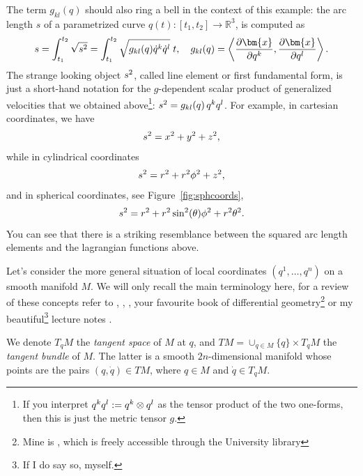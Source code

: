 \documentclass[english,fontsize=11pt,paper=a5,oneside]{scrbook}
\newcommand{\R}{\mathbb{R}}
\newcommand{\bx}{\bm{x}}
\newcommand{\lag}{\langle}
\newcommand{\rag}{\rangle}
\let\d\relax
\newcommand{\d}{\mathrm{d}}
\theoremstyle{definition}
\begin{document}
The term $g_{kl} (q)$ should also ring a bell in the context of this example: the arc length $s$ of a parametrized curve $q(t) : [t_1,t_2] \to \R^3$, is computed as
\begin{equation}\label{eq:arclen}
  \begin{aligned}
    s = \int_{t_1}^{t_2} \sqrt{\d s^2} = \int_{t_1}^{t_2} \sqrt{g_{kl}(q)\dot q^k \dot q^l} \;\d t,\quad
    g_{kl} (q) = \left\lag\frac{\partial\bx}{\partial q^k}, \frac{\partial \bx}{\partial q^l}\right\rag.
  \end{aligned}
\end{equation}
The strange looking object $\d s^2$, called line element or first fundamental form, is just a short-hand notation for the $g$-dependent scalar product of generalized velocities that we obtained above\footnote{If you interpret $\d q^k \d q^l := \d q^k \otimes \d q^l$ as the tensor product of the two one-forms, then this is just the metric tensor $g$.}: $\d s^2 = g_{kl}(q)\, \d q^k \d q^l$.
For example, in cartesian coordinates, we have
\begin{equation}
  \d s^2 = \d x^2 + \d y^2 + \d z^2,
\end{equation}
while in cylindrical coordinates
\begin{equation}
  \d s^2 = \d r^2 + r^2 \d \phi^2 + \d z^2,
\end{equation}
and in spherical coordinates, see Figure~\ref{fig:sphcoords},
\begin{equation}\label{eq:spharc}
  \d s^2 = \d r^2 + r^2 \sin^2(\theta) \d \phi^2 + r^2 \d \theta^2.
\end{equation}
You can see that there is a striking resemblance between the squared arc length elements and the lagrangian functions above.

Let's consider the more general situation of local coordinates $(q^1, \ldots, q^n)$ on a smooth manifold $M$.
We will only recall the main terminology here, for a review of these concepts refer to \cite[Chapter 4.18]{book:arnold}, \cite[Appendix A]{book:knauf}, \cite[Chapter 4]{book:marsdenratiu}, your favourite book of differential geometry\footnote{Mine is \cite{book:lee}, which is freely accessible through the University library} or my beautiful\footnote{If I do say so, myself.} lecture notes \cite{lectures:aom:seri}.

We denote $T_q M$ the \emph{tangent space} of $M$ at $q$, and $TM = \cup_{q\in M}\{q\}\times T_q M$ the \emph{tangent bundle} of $M$. The latter is a smooth $2n$-dimensional manifold whose points are the pairs $(q,\dot q)\in TM$, where $q\in M$ and $\dot q\in T_q M$.
\end{document}
